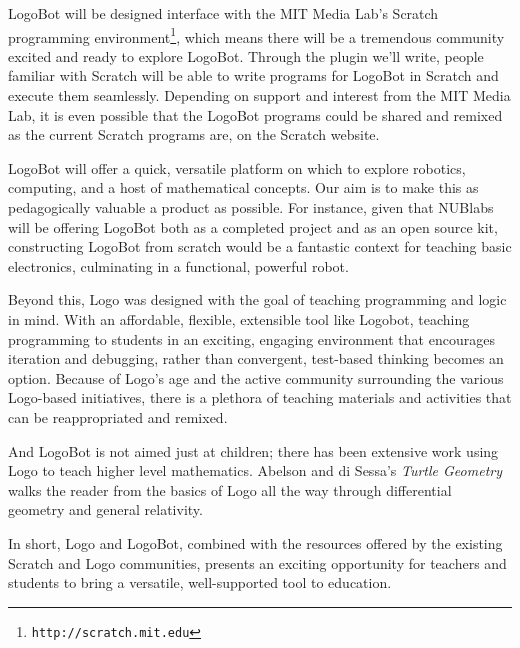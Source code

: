 \documentclass[10pt]{article}
\begin{document}
LogoBot will be designed interface with the MIT Media Lab's Scratch programming environment\footnote{\texttt{http://scratch.mit.edu}}, which means there will be a tremendous community excited and ready to explore LogoBot.  Through the plugin we'll write, people familiar with Scratch will be able to write programs for LogoBot in Scratch and execute them seamlessly.  Depending on support and interest from the MIT Media Lab, it is even possible that the LogoBot programs could be shared and remixed as the current Scratch programs are, on the Scratch website.

LogoBot will offer a quick, versatile platform on which to explore robotics, computing, and a host of mathematical concepts.  Our aim is to make this as pedagogically valuable a product as possible. For instance, given that NUBlabs will be offering LogoBot both as a completed project and as an open source kit, constructing LogoBot from scratch would be a fantastic context for teaching basic electronics, culminating in a functional, powerful robot.
  
Beyond this, Logo was designed with the goal of teaching programming and logic in mind.  With an affordable, flexible, extensible tool like Logobot, teaching programming to students in an exciting, engaging environment that encourages iteration and debugging, rather than convergent, test-based thinking becomes an option.  Because of Logo's age and the active community surrounding the various Logo-based initiatives, there is a plethora of teaching materials and activities that can be reappropriated and remixed.

And LogoBot is not aimed just at children; there has been extensive work using Logo to teach higher level mathematics.  Abelson and di Sessa's \textit{Turtle Geometry} walks the reader from the basics of Logo all the way through differential geometry and general relativity.

In short, Logo and LogoBot, combined with the resources offered by the existing Scratch and Logo communities, presents an exciting opportunity for teachers and students to bring a versatile, well-supported tool to education.
\end{document}
